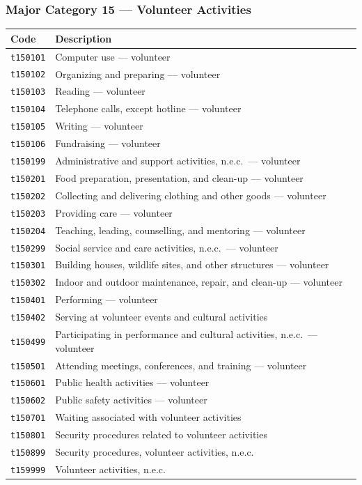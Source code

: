 \documentclass[11pt, a4paper]{article}
\begin{document}
\subsubsection*{Major Category 15 --- Volunteer Activities}
\begin{longtable}{L{3cm} L{13cm}}
\toprule \textbf{Code} & \textbf{Description} \\ \midrule \endhead
\bottomrule \endfoot
\texttt{t150101} & Computer use --- volunteer \\
 \texttt{t150102} & Organizing and preparing --- volunteer \\
\texttt{t150103} & Reading --- volunteer \\
 \texttt{t150104} & Telephone calls, except hotline --- volunteer \\
\texttt{t150105} & Writing --- volunteer \\
 \texttt{t150106} & Fundraising --- volunteer \\
\texttt{t150199} & Administrative and support activities, n.e.c.\ --- volunteer \\
 \texttt{t150201} & Food preparation, presentation, and clean-up --- volunteer \\
\texttt{t150202} & Collecting and delivering clothing and other goods --- volunteer \\
 \texttt{t150203} & Providing care --- volunteer \\
\texttt{t150204} & Teaching, leading, counselling, and mentoring --- volunteer \\
 \texttt{t150299} & Social service and care activities, n.e.c.\ --- volunteer \\
\texttt{t150301} & Building houses, wildlife sites, and other structures --- volunteer \\
 \texttt{t150302} & Indoor and outdoor maintenance, repair, and clean-up --- volunteer \\
\texttt{t150401} & Performing --- volunteer \\
 \texttt{t150402} & Serving at volunteer events and cultural activities \\
\texttt{t150499} & Participating in performance and cultural activities, n.e.c.\ --- volunteer \\
 \texttt{t150501} & Attending meetings, conferences, and training --- volunteer \\
\texttt{t150601} & Public health activities --- volunteer \\
 \texttt{t150602} & Public safety activities --- volunteer \\
\texttt{t150701} & Waiting associated with volunteer activities \\
 \texttt{t150801} & Security procedures related to volunteer activities \\
\texttt{t150899} & Security procedures, volunteer activities, n.e.c. \\
 \texttt{t159999} & Volunteer activities, n.e.c. \\
\end{longtable}
\end{document}
